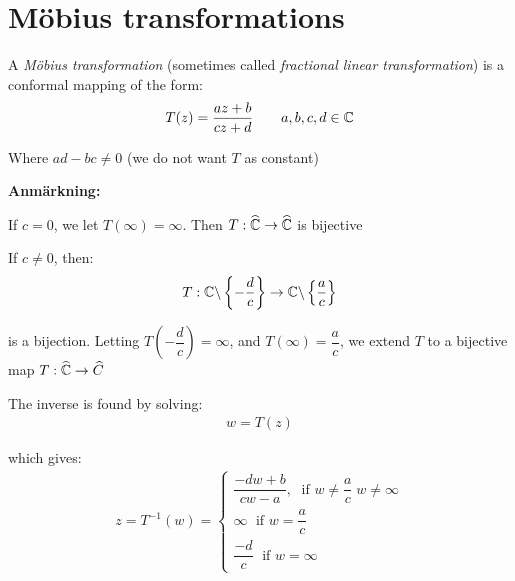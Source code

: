 \section{Möbius transformations}
\par\bigskip
\begin{theo}{}
  A \textit{Möbius transformation} (sometimes called \textit{fractional linear transformation}) is a conformal mapping of the form:
  \begin{equation*}
    \begin{gathered}
      T(z) = \dfrac{az+b}{cz+d}\qquad a,b,c,d\in\mathbb{C}
    \end{gathered}
  \end{equation*}
  \par\bigskip
  \noindent Where $ad-bc\neq0$ (we do not want $T$ as constant)
\end{theo}
\par\bigskip
\noindent\textbf{Anmärkning:}\par
\noindent If $c=0$, we let $T(\infty) = \infty$. Then $T:\widehat{\mathbb{C}}\to\widehat{\mathbb{C}}$ is bijective
\par\bigskip
\noindent If $c\neq0$, then:
\begin{equation*}
  \begin{gathered}
    T:\mathbb{C}\backslash\left\{-\dfrac{d}{c}\right\}\to\mathbb{C}\backslash\left\{\dfrac{a}{c}\right\}
  \end{gathered}
\end{equation*}\par
\noindent is a bijection. Letting $T\left(-\dfrac{d}{c}\right)=\infty$, and $T(\infty) = \dfrac{a}{c}$, we extend $T$  to a bijective map $T:\widehat{\mathbb{C}}\to\widehat{C}$
\par\bigskip
\noindent The inverse is found by solving:
\begin{equation*}
  \begin{gathered}
    w = T(z)
  \end{gathered}
\end{equation*}\par
\noindent which gives:
\begin{equation*}
  \begin{gathered}
    z = T^{-1}(w)=
    \begin{cases}
    \dfrac{-dw+b}{cw-a},\;\text{ if } w\neq\dfrac{a}{c}\; w\neq\infty\\
    \infty\;\text{ if } w=\dfrac{a}{c}\\
    \dfrac{-d}{c}\;\text{ if } w =\infty
  \end{cases}
  \end{gathered}
\end{equation*}
